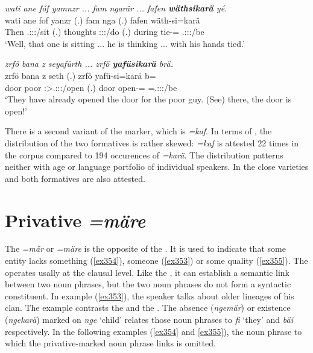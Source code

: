 \begin{exe}
	\ex \emph{wati ane fóf yamnzr ... fam ngarär ... fafen \textbf{wäthsikarä} yé.}\\
	\gll wati ane fof yanzr (.) fam nga (.) fafen wäth-si=karä \\
	Then \Dem{} \Emph{} \Tsg.\Masc:\Sbj:\Nonpast:\Ipfv/sit (.) thoughts \Stsg:\Sbj:\Nonpast:\Ipfv/do (.) during tie-\Nmlz=\Prop{} \Tsg.\Masc:\Sbj:\Nonpast:\Ipfv/be\\
	\trans `Well, that one is sitting ... he is thinking ... with his hands tied.'\\
	\label{ex348}
\end{exe}
\begin{exe}
	\ex \emph{zrfö bana z seyafürth ... zrfö \textbf{yafüsikarä} brä.}\\
	\gll zrfö bana z seth (.) zrfö yafü-si=karä b=\\
	door poor \Iam{} \Stpl:\Sbj>\Tsg.\Masc:\Io:\Rpst:\Pfv/open (.) door open-\Nmlz=\Prop{} \Med=\Tsg.\Masc:\Sbj:\Nonpast:\Ipfv/be\\
	\trans `They have already opened the door for the poor guy. (See) there, the door is open!'
	\label{ex349}
\end{exe}
	
There is a second variant of the  marker, which is \emph{=kaf}. In terms of , the distribution of the two formatives is rather skewed: \emph{=kaf} is attested 22 times in the corpus compared to 194 occurences of \emph{=karä}. The distribution patterns neither with age or language portfolio of individual speakers. In the close varieties  and  both formatives are also attested.

\section{Privative \emph{=märe}} \label{privcase}

The   \emph{=mär} or \emph{=märe} is the opposite of the . It is used to indicate that some entity lacks something (\ref{ex354}), someone (\ref{ex353}) or some quality (\ref{ex355}). The  operates usally at the clausal level. Like the  , it can establish a semantic link between two noun phrases, but the two noun phrases do not form a syntactic constituent. In example (\ref{ex353}), the speaker talks about older lineages of his clan. The example contrasts the  and the  . The absence (\emph{ngemär}) or existence (\emph{ngekarä}) marked on \emph{nge} `child' relates those noun phrases to \emph{fi} `they' and \emph{bäi} respectively. In the following examples (\ref{ex354} and \ref{ex355}), the noun phrase to which the privative-marked noun phrase links is omitted.

